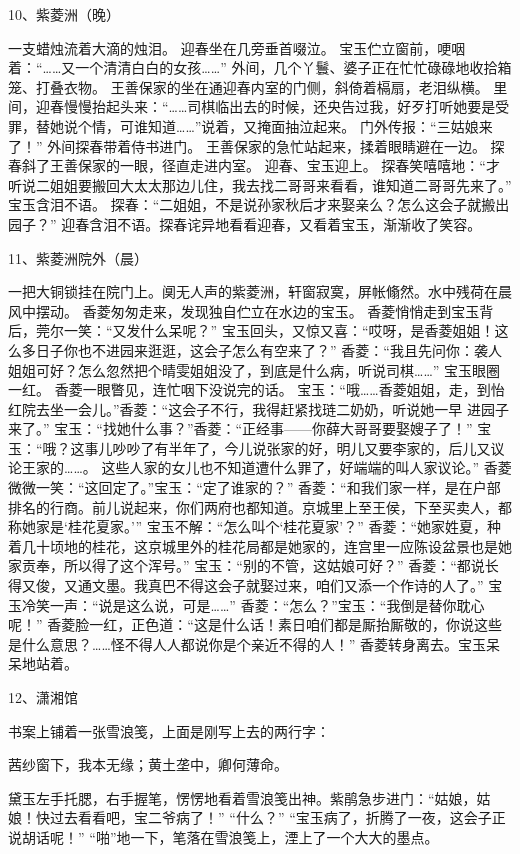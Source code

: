 10、紫菱洲（晚）\par
一支蜡烛流着大滴的烛泪。
迎春坐在几旁垂首啜泣。
宝玉伫立窗前，哽咽着：“……又一个清清白白的女孩……”
外间，几个丫鬟、婆子正在忙忙碌碌地收拾箱笼、打叠衣物。
王善保家的坐在通迎春内室的门侧，斜倚着槅扇，老泪纵横。
里间，迎春慢慢抬起头来：“……司棋临出去的时候，还央告过我，好歹打听她要是受罪，替她说个情，可谁知道……”说着，又掩面抽泣起来。
门外传报：“三姑娘来了！”
外间探春带着侍书进门。
王善保家的急忙站起来，揉着眼睛避在一边。
探春斜了王善保家的一眼，径直走进内室。
迎春、宝玉迎上。
探春笑嘻嘻地：“才听说二姐姐要搬回大太太那边儿住，我去找二哥哥来看看，谁知道二哥哥先来了。”
宝玉含泪不语。
探春：“二姐姐，不是说孙家秋后才来娶亲么？怎么这会子就搬出园子？”
迎春含泪不语。探春诧异地看看迎春，又看着宝玉，渐渐收了笑容。

11、紫菱洲院外（晨）\par
一把大铜锁挂在院门上。阒无人声的紫菱洲，轩窗寂寞，屏帐翛然。水中残荷在晨风中摆动。
香菱匆匆走来，发现独自伫立在水边的宝玉。
香菱悄悄走到宝玉背后，莞尔一笑：“又发什么呆呢？”
宝玉回头，又惊又喜：“哎呀，是香菱姐姐！这么多日子你也不进园来逛逛，这会子怎么有空来了？”
香菱：“我且先问你：袭人姐姐可好？怎么忽然把个晴雯姐姐没了，到底是什么病，听说司棋……”
宝玉眼圈一红。
香菱一眼瞥见，连忙咽下没说完的话。
宝玉：“哦……香菱姐姐，走，到怡红院去坐一会儿。”香菱：“这会子不行，我得赶紧找琏二奶奶，听说她一早
进园子来了。”
宝玉：“找她什么事？”香菱：“正经事——你薛大哥哥要娶嫂子了！”
宝玉：“哦？这事儿吵吵了有半年了，今儿说张家的好，明儿又要李家的，后儿又议论王家的……。
这些人家的女儿也不知道遭什么罪了，好端端的叫人家议论。”
香菱微微一笑：“这回定了。”宝玉：“定了谁家的？”
香菱：“和我们家一样，是在户部排名的行商。前儿说起来，你们两府也都知道。京城里上至王侯，下至买卖人，都称她家是‘桂花夏家。’”
宝玉不解：“怎么叫个‘桂花夏家’？”
香菱：“她家姓夏，种着几十顷地的桂花，这京城里外的桂花局都是她家的，连宫里一应陈设盆景也是她家贡奉，所以得了这个浑号。”
宝玉：“别的不管，这姑娘可好？”
香菱：“都说长得又俊，又通文墨。我真巴不得这会子就娶过来，咱们又添一个作诗的人了。”
宝玉冷笑一声：“说是这么说，可是……”
香菱：“怎么？”宝玉：“我倒是替你耽心呢！”
香菱脸一红，正色道：“这是什么话！素日咱们都是厮抬厮敬的，你说这些是什么意思？……怪不得人人都说你是个亲近不得的人！”
香菱转身离去。宝玉呆呆地站着。

12、潇湘馆\par
书案上铺着一张雪浪笺，上面是刚写上去的两行字：

茜纱窗下，我本无缘；黄土垄中，卿何薄命。

黛玉左手托腮，右手握笔，愣愣地看着雪浪笺出神。紫鹃急步进门：“姑娘，姑娘！快过去看看吧，宝二爷病了！”
“什么？”
“宝玉病了，折腾了一夜，这会子正说胡话呢！”
“啪”地一下，笔落在雪浪笺上，湮上了一个大大的墨点。

